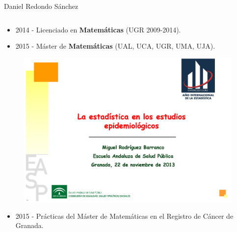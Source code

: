 \documentclass{beamer}
\begin{document}
\begin{frame}
\begin{block}{Daniel Redondo Sánchez}
\begin{columns}
\begin{column}{0.74\textwidth}
				\begin{itemize}
					\item 2014 - Licenciado en \textbf{Matemáticas} (UGR 2009-2014).
					\item 2015 - Máster de \textbf{Matemáticas} (UAL, UCA, UGR, UMA, UJA).
				\end{itemize}
			\vspace{-10pt}
				\begin{figure}
					\centering
					\includegraphics[width=.5\textwidth]{images/miguel.png}
				\end{figure}
			\vspace{-10pt}
				\begin{itemize}
					\item 2015 - Prácticas del Máster de Matemáticas en el Registro de Cáncer de Granada.
				\end{itemize}

			\end{column}
		\end{columns}
	\end{block}
\end{frame}

\end{document}
